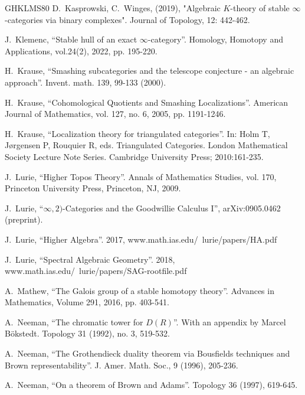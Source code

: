 \documentclass[11pt,leqno]{amsart}
\numberwithin{equation}{section}
\begin{document}
\begin{thebibliography}{GHKLMS80}
 D.~Kasprowski, C.~Winges, (2019), "Algebraic $K$-theory of stable $\infty$-categories via binary complexes". Journal of Topology, 12: 442-462.

 J.~Klemenc, ``Stable hull of an exact $\infty$-category''. Homology, Homotopy and Applications, vol.24(2), 2022, pp. 195-220.

H.~Krause, ``Smashing subcategories and the telescope conjecture - an algebraic approach''. Invent. math. 139, 99-133 (2000).

H.~Krause, ``Cohomological Quotients and Smashing Localizations''. American Journal of Mathematics, vol. 127, no. 6, 2005, pp. 1191-1246.

 H.~Krause, ``Localization theory for triangulated categories''. In: Holm T, Jørgensen P, Rouquier R, eds. Triangulated Categories. London Mathematical Society Lecture Note Series. Cambridge University Press; 2010:161-235.

 J.~Lurie, ``Higher Topos Theory''. Annals of Mathematics Studies, vol. 170, Princeton
University Press, Princeton, NJ, 2009.

 J.~Lurie, ``$\infty,2)$-Categories and the Goodwillie Calculus I'', arXiv:0905.0462 (preprint).


 J.~Lurie, ``Higher Algebra''. 2017, www.math.ias.edu/~lurie/papers/HA.pdf

 J.~Lurie, ``Spectral Algebraic Geometry''. 2018, www.math.ias.edu/~lurie/papers/SAG-rootfile.pdf

A.~Mathew, ``The Galois group of a stable homotopy theory''. Advances in Mathematics, Volume 291, 2016, pp. 403-541.

A.~Neeman, ``The chromatic tower for $D(R)$''. With an appendix by Marcel B\"okstedt. Topology 31 (1992), no. 3, 519-532.

 A.~Neeman, ``The Grothendieck duality theorem via Bousfields techniques and Brown representability''. J. Amer. Math. Soc., 9 (1996), 205-236.

 A.~Neeman, ``On a theorem of Brown and Adams''. Topology 36 (1997), 619-645.


\end{thebibliography}
\end{document}
